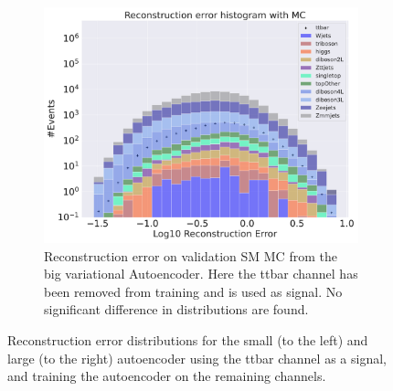 \begin{figure}[h!]
\begin{subfigure}{.45\textwidth}
        \includegraphics[width=\textwidth]{Figures/VAE_testing/big/b_data_recon_big_rm3_feats_sig_ttbar.pdf}
        \caption{Reconstruction error on validation SM MC from the big variational Autoencoder. Here the ttbar channel has been removed from training and 
        is used as signal. No significant difference in distributions are found. }
        \label{fig:vae_big_ttbar}
    \end{subfigure}
    \hfill 
    \caption[Reconstruction error using ttbar channel as signal]{Reconstruction error distributions for the small (to the left) and large (to the right) autoencoder using the ttbar channel as a signal, and 
    training the autoencoder on the remaining channels. }
    \label{fig:vae_big_channel_3}
\end{figure}

